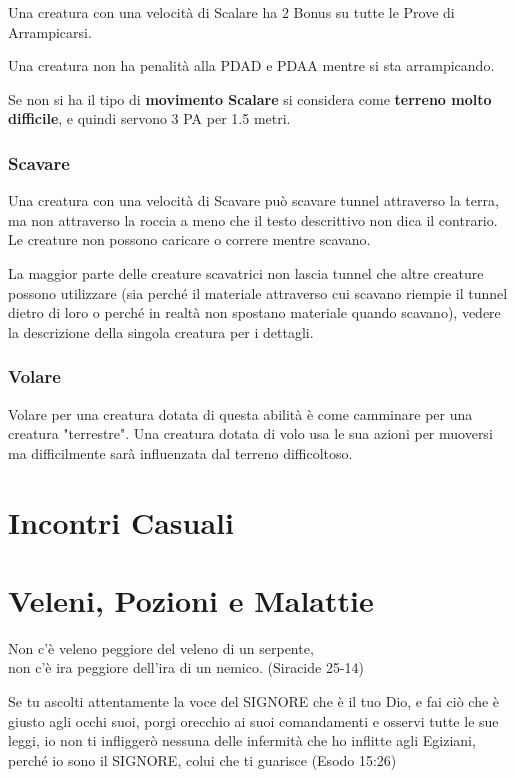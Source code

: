 \documentclass[12pt,a4paper,twoside,openany]{book}
\begin{document}
\begin{multicols}{2}
Una creatura con una velocità di Scalare ha 2 Bonus su tutte le Prove di Arrampicarsi. 

Una creatura non ha penalità alla PDAD e PDAA mentre si sta arrampicando.

Se non si ha il tipo di \textbf{movimento Scalare} si considera come \textbf{terreno molto difficile}, e quindi servono 3 PA per 1.5 metri.

\subsubsection{Scavare}\label{scavare}

Una creatura con una velocità di Scavare può scavare tunnel attraverso la terra, ma non attraverso la roccia a meno che il testo descrittivo non dica il contrario. Le creature non possono caricare o correre mentre scavano.

La maggior parte delle creature scavatrici non lascia tunnel che altre creature possono utilizzare (sia perché il materiale attraverso cui scavano riempie il tunnel dietro di loro o perché in realtà non spostano materiale quando scavano), vedere la descrizione della singola creatura per i dettagli.

\subsubsection{Volare}\label{volare}

Volare per una creatura dotata di questa abilità è come camminare per una creatura "terrestre". Una creatura dotata di volo usa le sua azioni per muoversi ma difficilmente sarà influenzata dal terreno difficoltoso.

\end{multicols}

\pagebreak

\section{Incontri Casuali}

\pagebreak
\section{Veleni, Pozioni e Malattie}

\label{veleni-e-pozioni}


\begin{changemargin}{0.3cm}{0.3cm}\begin{enfasi}{
Non c'è veleno peggiore del veleno di un serpente,\\
non c'è ira peggiore dell'ira di un nemico. (Siracide 25-14)\\\medskip

Se tu ascolti attentamente la voce del SIGNORE che è il tuo Dio, e fai ciò che è giusto agli occhi suoi, porgi orecchio ai suoi comandamenti e osservi tutte le sue leggi, io non ti infliggerò nessuna delle infermità che ho inflitte agli Egiziani, perché io sono il SIGNORE, colui che ti guarisce (Esodo 15:26)
}\end{enfasi}\end{changemargin}\medskip
\end{document}
